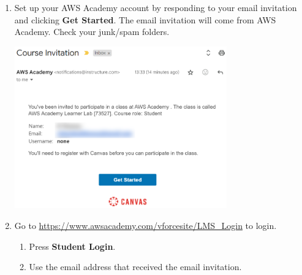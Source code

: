 \documentclass{csse4400}
\begin{document}
\begin{enumerate}
    \item
        Set up your AWS Academy account by responding to your email invitation and clicking \textbf{Get Started}.
        The email invitation will come from AWS Academy.
        Check your junk/spam folders.

        \hspace{10mm}
        \includegraphics[trim=0 45 0 0,clip,width=0.72\textwidth]{images/email-invite}

    \item Go to \url{https://www.awsacademy.com/vforcesite/LMS_Login} to login.
    \begin{enumerate}
        \item Press \textbf{Student Login}.
        \item Use the email address that received the email invitation.
    \end{enumerate}


\end{enumerate}
\end{document}
